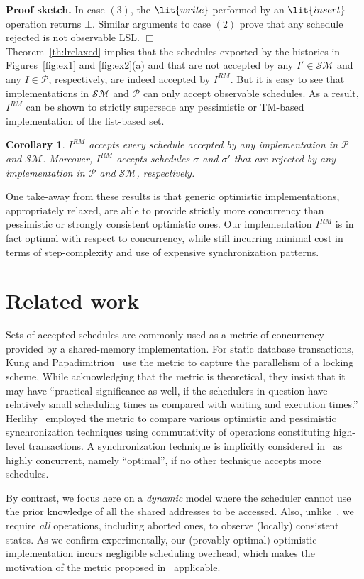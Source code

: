 \documentclass[11pt,pdftex,letterpaper]{article}
\newtheorem{corollary}[theorem]{Corollary}
\newenvironment{proofsketch}[1][Proof sketch]{\noindent\textbf{#1.} }{\hfill $\Box$\\[2mm]}
\begin{document}
\begin{proofsketch}
In case $(3)$, the $\lit{write}$ performed by an $\lit{insert}$ operation returns $\bot$. Similar arguments to
case $(2)$ prove that any schedule rejected is not observable LSL.
\end{proofsketch}
Theorem~\ref{th:lrelaxed} implies that the schedules exported by the
histories in Figures~\ref{fig:ex1} and \ref{fig:ex2}(a) and that are not
accepted by any $I'\in \mathcal{SM}$ and any $I\in \mathcal{P}$, respectively,
are indeed accepted by $I^{RM}$.
But it is easy to see that implementations in $\mathcal{SM}$ and $\mathcal{P}$ can only
accept observable schedules.  
As a result, $I^{RM}$ can be shown to strictly supersede any
pessimistic or TM-based implementation of the list-based set.  
\begin{corollary}
\label{cr:mrp}
$I^{RM}$ accepts every schedule accepted by any implementation in $\mathcal{P}$ and $\mathcal{SM}$.
Moreover, $I^{RM}$ accepts schedules $\sigma$ and $\sigma'$ that are rejected by any
implementation in $\mathcal{P}$ and $\mathcal{SM}$, respectively. 
\end{corollary}
One take-away from these results is that generic optimistic implementations,
appropriately relaxed, are able to provide strictly more concurrency
than pessimistic or strongly consistent optimistic ones.
Our implementation $I^{RM}$ is in fact optimal with respect to
concurrency, while still incurring minimal cost in terms of step-complexity and
use of expensive synchronization patterns. 
\section{Related work}
\label{sec:related}
Sets of accepted schedules are commonly used as a
metric of concurrency provided by a shared-memory
implementation.
For static database transactions, 
Kung and Papadimitriou~\cite{KP79} use the metric to 
capture the parallelism of a locking scheme,
While acknowledging that the metric is theoretical, they 
insist that it may
have ``practical significance as
well, if the schedulers in question have relatively small
scheduling times as compared with waiting and execution
times.'' 
Herlihy~\cite{Her90} employed the metric to compare various
optimistic and pessimistic synchronization techniques using
commutativity
of operations constituting high-level transactions.   
A synchronization technique is implicitly considered in~\cite{Her90} as highly
concurrent, namely ``optimal'',
if no other technique accepts more schedules. 


By contrast, we focus here on a \emph{dynamic} model where the scheduler cannot 
use the prior knowledge of all the shared addresses to be accessed. 
Also, unlike~\cite{KP79,Her90}, we require \emph{all} operations, including aborted ones, to observe (locally) consistent states.
As we confirm experimentally, 
our (provably optimal) optimistic implementation incurs negligible scheduling overhead, which makes the motivation of the metric proposed
in~\cite{KP79} applicable. 
\end{document}
